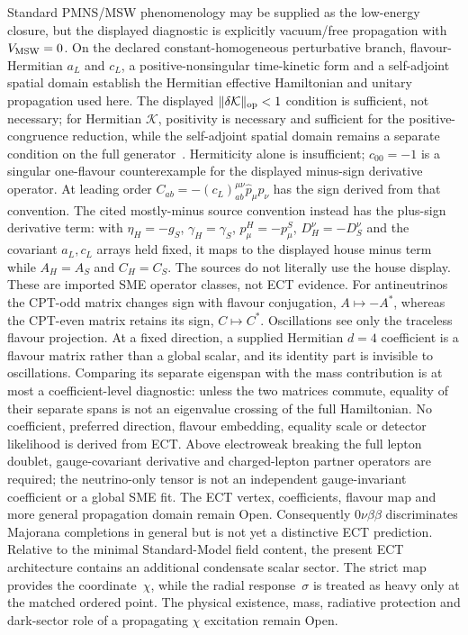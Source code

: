 \documentclass[11pt,a4paper]{article}
\begin{document}
Standard PMNS/MSW phenomenology may be supplied as the low-energy closure,
but the displayed diagnostic is explicitly vacuum/free propagation with
$V_{\rm MSW}=0$.  On the declared constant-homogeneous perturbative branch,
flavour-Hermitian $a_L$ and $c_L$, a positive-nonsingular time-kinetic form
and a self-adjoint spatial domain establish the Hermitian effective Hamiltonian
and unitary propagation used here.  The displayed
$\|\delta\mathcal K\|_{\rm op}<1$ condition is sufficient, not necessary;
for Hermitian $\mathcal K$, positivity is necessary and sufficient for the
positive-congruence reduction, while the self-adjoint spatial domain remains
a separate condition on the full generator~\cite{KosteleckyMewes2004NeutrinoLV,
KosteleckyMewes2012NeutrinoOperators}.  Hermiticity alone is insufficient;
$c_{00}=-1$ is a singular one-flavour counterexample for the displayed
minus-sign derivative operator.  At leading order
$C_{ab}=-(c_L)^{\mu\nu}_{ab}\widehat p_\mu\widehat p_\nu$ has the sign derived
from that convention.  The cited mostly-minus source convention instead has
the plus-sign derivative term: with $\eta_H=-g_S$, $\gamma_H=\gamma_S$,
$p^H_\mu=-p^S_\mu$, $D_H^\nu=-D_S^\nu$ and the covariant $a_L,c_L$ arrays
held fixed, it maps to the displayed house minus term while $A_H=A_S$ and
$C_H=C_S$.  The sources do not literally use the house display.  These are
imported SME operator
classes, not ECT evidence.  For antineutrinos the CPT-odd matrix
changes sign with flavour conjugation, $A\mapsto-A^*$, whereas the CPT-even
matrix retains its sign, $C\mapsto C^*$.  Oscillations see only the traceless
flavour projection.  At a fixed direction, a supplied Hermitian $d=4$
coefficient is a flavour matrix rather than a global scalar, and its identity
part is invisible to oscillations.  Comparing its separate eigenspan with the
mass contribution is at most a coefficient-level diagnostic: unless the two
matrices commute, equality of their separate spans is not an eigenvalue
crossing of the full Hamiltonian.  No coefficient, preferred direction,
flavour embedding, equality scale or detector likelihood is derived from
ECT.  Above electroweak breaking the full lepton doublet, gauge-covariant
derivative and charged-lepton partner operators are required; the
neutrino-only tensor is not an independent gauge-invariant coefficient or a
global SME fit.  The ECT vertex, coefficients, flavour map and more general
propagation domain remain Open.
Consequently $0\nu\beta\beta$ discriminates Majorana completions in
general but is not yet a distinctive ECT prediction.
Relative to the minimal Standard-Model field content, the present ECT
architecture contains an additional condensate scalar sector.  The strict map
provides the coordinate~$\chi$, while the radial response~$\sigma$ is treated
as heavy only at the matched ordered point.  The physical existence, mass,
radiative protection and dark-sector role of a propagating $\chi$ excitation
remain Open.
\end{document}
